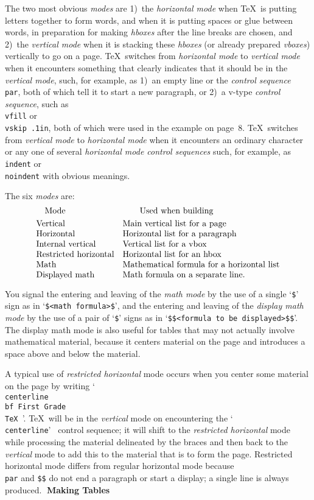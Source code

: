 The two most obvious {\sl modes} are 1)~the {\sl horizontal mode} when
\TeX\ is putting letters together to form words, and when it is putting
spaces or glue between words, in preparation for making {\sl hboxes} after the
line breaks are chosen,
and 2)~the {\sl vertical mode} when it is stacking these
{\sl hboxes} (or already prepared {\sl vboxes}) vertically to go on a
page. \TeX\ switches from {\sl horizontal mode} to {\sl vertical mode} when it
encounters something that clearly indicates that it should be in the {\sl vertical
mode}, such, for example, as 1)~an empty line or the {\sl control sequence}
{\tt \\par}, both of which tell it to start a new paragraph, or 2)~a v-type
{\sl control sequence}, such as {\tt \\vfill} or {\tt \\vskip .1in}, both of which were
used in the example on page~8.  \TeX\ switches from {\sl vertical mode} to {\sl 
horizontal mode} when it encounters an ordinary character or any one of several 
{\sl horizontal mode control sequences} such, for example, as {\tt \\indent} or
{\tt \\noindent} with obvious meanings.

The six {\sl modes} are:
$$\vbox{\halign{#\quad\hfil&#\hfil\cr
\quad Mode&\qquad Used when building\cr
\noalign{\smallskip}
Vertical&Main vertical list for a page\cr
Horizontal&Horizontal list for a paragraph\cr
Internal vertical& Vertical list for a vbox\cr
Restricted horizontal&Horizontal list for an hbox\cr
Math&Mathematical formula for a horizontal list\cr
Displayed math&Math formula on a separate line.\cr}}$$

You signal the entering and leaving of the {\sl math mode} by the use of a
single `{\tt\$}' sign as in `{\tt \$<math~formula>\$}', and the entering and
leaving of the {\sl display math mode} by the use of a pair of `{\tt\$}' signs as in
`{\tt \${}\$<formula~to~be~displayed>\${}\$}'.  The display math mode is also useful
for tables that may not actually involve mathematical material, because it
centers material on the page and introduces a space above and below the
material.

A typical use of {\sl restricted horizontal} mode occurs when you center some
material on the page by writing `{\tt \\centerline\lbr\\bf\ First Grade \\TeX \rbr}'.
\TeX\ will be in the {\sl vertical} mode on encountering the
`{\tt \\centerline}' \ control
sequence; it will shift to the {\sl restricted horizontal} mode while
processing the  material delineated by the braces and then back to
the {\sl vertical} mode to add this to the material that is to form the page.
Restricted horizontal mode differs from regular horizontal mode because {\tt \\par}
and {\tt \$\$} do not end a paragraph or start a display; a single line is
always produced.
{\bf Making Tables}

